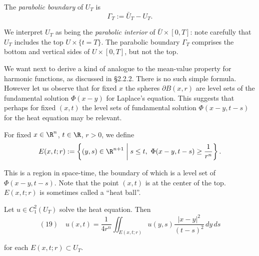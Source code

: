 \begin{figure}[h]\centering
\end{figure}

\begin{definition}
\label{def:parabolic-boundary-heat-ball}
\leanok
The \textit{parabolic boundary} of $U_T$ is
$$\Gamma_T := \bar{U}_T - U_T.$$
\end{definition}

We interpret $U_T$ as being the \textit{parabolic interior} of $\bar{U} \times [0,T]$: note carefully that $U_T$ includes the top $U \times \{t=T\}$. The parabolic boundary $\Gamma_T$ comprises the bottom and vertical sides of $U \times [0,T]$, but not the top.

We want next to derive a kind of analogue to the mean-value property for harmonic functions, as discussed in \S2.2.2. There is no such simple formula. However let us observe that for fixed $x$ the spheres $\partial B(x,r)$ are level sets of the fundamental solution $\Phi(x-y)$ for Laplace's equation. This suggests that perhaps for fixed $(x,t)$ the level sets of fundamental solution $\Phi(x-y,t-s)$ for the heat equation may be relevant.

\begin{definition}
\label{def:heat-ball}
\leanok
For fixed $x \in \R^n$, $t \in \R$, $r > 0$, we define
$$E(x,t;r) := \left\{(y,s) \in \R^{n+1} \;\middle|\; s \leq t, \ \Phi(x-y,t-s) \geq \frac{1}{r^n}\right\}.$$
\end{definition}

This is a region in space-time, the boundary of which is a level set of $\Phi(x-y,t-s)$. Note that the point $(x,t)$ is at the center of the top. $E(x,t;r)$ is sometimes called a ``heat ball''.

\begin{theorem}
\label{thm:mean-value-property-heat-equation}
Let $u \in C^2_1(U_T)$ solve the heat equation. Then
$$(19) \quad u(x,t) = \frac{1}{4r^n} \iint_{E(x,t;r)} u(y,s) \frac{|x-y|^2}{(t-s)^2} \, dy\,ds$$

\begin{figure}[h]\centering
\end{figure}

for each $E(x,t;r) \subset U_T$.
\end{theorem}

